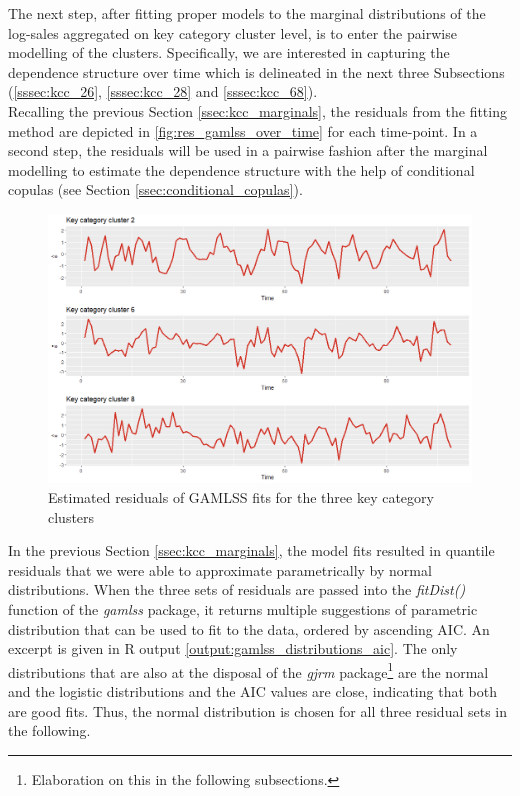 
The next step, after fitting proper models to the marginal distributions of the log-sales aggregated on key category cluster level, is to enter the pairwise modelling of the clusters. Specifically, we are interested in capturing the dependence structure over time which is delineated in the next three Subsections (\ref{sssec:kcc_26}, \ref{sssec:kcc_28} and \ref{sssec:kcc_68}).
\\

Recalling the previous Section \ref{ssec:kcc_marginals}, the residuals from the fitting method are depicted in \autoref{fig:res_gamlss_over_time} for each time-point. In a second step, the residuals will be used in a pairwise fashion after the marginal modelling to estimate the dependence structure with the help of conditional copulas (see Section \ref{ssec:conditional_copulas}).

\begin{figure}[H]
\centering
  \includegraphics[width=0.95\linewidth]{figures/res_gamlss_over_time.png}
  \caption{Estimated residuals of GAMLSS fits for the three key category clusters}
  \label{fig:res_gamlss_over_time}
\end{figure}









In the previous Section \ref{ssec:kcc_marginals}, the model fits resulted in quantile residuals that we were able to approximate parametrically by normal distributions. When the three sets of residuals are passed into the \textit{fitDist()} function of the \textit{gamlss} package, it returns multiple suggestions of parametric distribution that can be used to fit to the data, ordered by ascending \ac{AIC}. An excerpt is given in R output \ref{output:gamlss_distributions_aic}. The only distributions that are also at the disposal of the \textit{gjrm} package\footnote{Elaboration on this in the following subsections.} are the normal and the logistic distributions and the \ac{AIC} values are close, indicating that both are good fits. Thus, the normal distribution is chosen for all three residual sets in the following.


